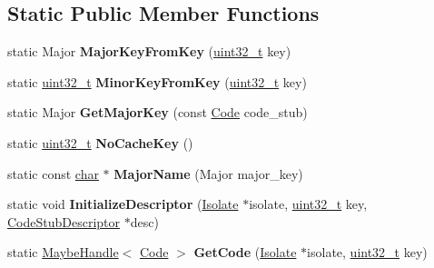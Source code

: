 \subsection*{Static Public Member Functions}
\begin{DoxyCompactItemize}
\item 
\mbox{\label{classv8_1_1internal_1_1CodeStub_ac34c7f14ec61a80cd7d39afd1a02a9f2}} 
static Major {\bfseries Major\+Key\+From\+Key} (\mbox{\hyperlink{classuint32__t}{uint32\+\_\+t}} key)
\item 
\mbox{\label{classv8_1_1internal_1_1CodeStub_acb62f5d4eaa6f12dbeaa790220570290}} 
static \mbox{\hyperlink{classuint32__t}{uint32\+\_\+t}} {\bfseries Minor\+Key\+From\+Key} (\mbox{\hyperlink{classuint32__t}{uint32\+\_\+t}} key)
\item 
\mbox{\label{classv8_1_1internal_1_1CodeStub_a7fb9f6a8a6c4f6fb31db03e33125a0e3}} 
static Major {\bfseries Get\+Major\+Key} (const \mbox{\hyperlink{classv8_1_1internal_1_1Code}{Code}} code\+\_\+stub)
\item 
\mbox{\label{classv8_1_1internal_1_1CodeStub_a216bae8cdb6faaf30e25c3ee6dcd674b}} 
static \mbox{\hyperlink{classuint32__t}{uint32\+\_\+t}} {\bfseries No\+Cache\+Key} ()
\item 
\mbox{\label{classv8_1_1internal_1_1CodeStub_adf29ce4f8d41908970b8d43c4714c6fc}} 
static const \mbox{\hyperlink{classchar}{char}} $\ast$ {\bfseries Major\+Name} (Major major\+\_\+key)
\item 
\mbox{\label{classv8_1_1internal_1_1CodeStub_a588320742fd43943338ed1704ce1aae6}} 
static void {\bfseries Initialize\+Descriptor} (\mbox{\hyperlink{classv8_1_1internal_1_1Isolate}{Isolate}} $\ast$isolate, \mbox{\hyperlink{classuint32__t}{uint32\+\_\+t}} key, \mbox{\hyperlink{classv8_1_1internal_1_1CodeStubDescriptor}{Code\+Stub\+Descriptor}} $\ast$desc)
\item 
\mbox{\label{classv8_1_1internal_1_1CodeStub_a0daac74e46ce67a36f086856eca81f0a}} 
static \mbox{\hyperlink{classv8_1_1internal_1_1MaybeHandle}{Maybe\+Handle}}$<$ \mbox{\hyperlink{classv8_1_1internal_1_1Code}{Code}} $>$ {\bfseries Get\+Code} (\mbox{\hyperlink{classv8_1_1internal_1_1Isolate}{Isolate}} $\ast$isolate, \mbox{\hyperlink{classuint32__t}{uint32\+\_\+t}} key)
\end{DoxyCompactItemize}
